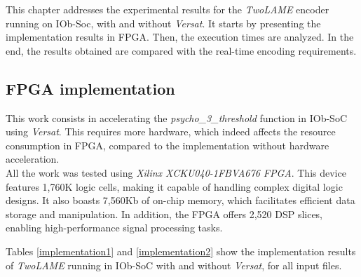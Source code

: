 



This chapter addresses the experimental results for the \textit{TwoLAME} encoder running on IOb-Soc, with and without \textit{Versat}.
It starts by presenting the implementation results in FPGA. Then, the execution times are analyzed. In the end, the results obtained are compared with the real-time encoding requirements.

\subsection{FPGA implementation}
This work consists in accelerating the \textit{psycho\_3\_threshold} function in IOb-SoC using \textit{Versat}. This requires more hardware, which indeed affects the resource consumption in FPGA, compared to the implementation without hardware acceleration. \\
All the work was tested using \textit{Xilinx XCKU040-1FBVA676 FPGA}. This device features 1,760K logic cells, making it capable of handling complex digital logic designs. It also boasts 7,560Kb of on-chip memory, which facilitates efficient data storage and manipulation. In addition, the FPGA offers 2,520 DSP slices, enabling high-performance signal processing tasks.  

Tables \ref{implementation1} and \ref{implementation2} show the implementation results of \textit{TwoLAME} running in IOb-SoC with and without \textit{Versat}, for all input files.

\vspace{1cm}


